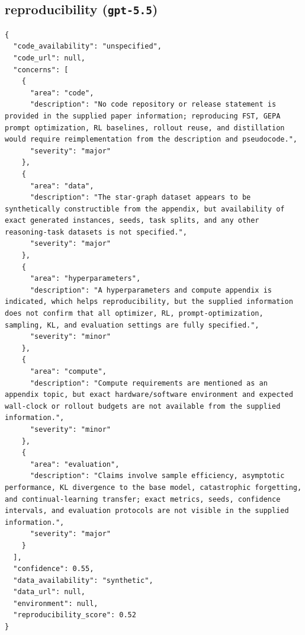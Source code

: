 \documentclass[11pt]{article}
\begin{document}
\subsection*{reproducibility (\texttt{gpt-5.5})}
\begin{verbatim}
{
  "code_availability": "unspecified",
  "code_url": null,
  "concerns": [
    {
      "area": "code",
      "description": "No code repository or release statement is provided in the supplied paper information; reproducing FST, GEPA prompt optimization, RL baselines, rollout reuse, and distillation would require reimplementation from the description and pseudocode.",
      "severity": "major"
    },
    {
      "area": "data",
      "description": "The star-graph dataset appears to be synthetically constructible from the appendix, but availability of exact generated instances, seeds, task splits, and any other reasoning-task datasets is not specified.",
      "severity": "major"
    },
    {
      "area": "hyperparameters",
      "description": "A hyperparameters and compute appendix is indicated, which helps reproducibility, but the supplied information does not confirm that all optimizer, RL, prompt-optimization, sampling, KL, and evaluation settings are fully specified.",
      "severity": "minor"
    },
    {
      "area": "compute",
      "description": "Compute requirements are mentioned as an appendix topic, but exact hardware/software environment and expected wall-clock or rollout budgets are not available from the supplied information.",
      "severity": "minor"
    },
    {
      "area": "evaluation",
      "description": "Claims involve sample efficiency, asymptotic performance, KL divergence to the base model, catastrophic forgetting, and continual-learning transfer; exact metrics, seeds, confidence intervals, and evaluation protocols are not visible in the supplied information.",
      "severity": "major"
    }
  ],
  "confidence": 0.55,
  "data_availability": "synthetic",
  "data_url": null,
  "environment": null,
  "reproducibility_score": 0.52
}
\end{verbatim}
\end{document}
